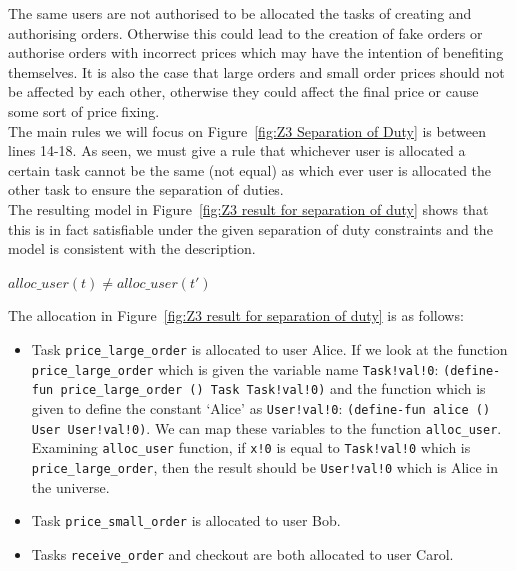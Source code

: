 \documentclass[a4paper]{report}
\begin{document}
The same users are not authorised to be allocated the tasks of creating and authorising orders. Otherwise this could lead to the creation of fake orders or authorise orders with incorrect prices which may have the intention of benefiting themselves. It is also the case that large orders and small order prices should not be affected by each other, otherwise they could affect the final price or cause some sort of price fixing.\\

The main rules we will focus on Figure~\ref{fig:Z3 Separation of Duty} is between lines 14-18. As seen, we must give a rule that whichever user is allocated a certain task cannot be the same (not equal) as which ever user is allocated the other task to ensure the separation of duties. \\

The resulting model in Figure~\ref{fig:Z3 result for separation of duty} shows that this is in fact satisfiable under the given separation of duty constraints and the model is consistent with the description.
\begin{center}
$alloc\_user(t) \neq alloc\_user(t\ensuremath{'})$
\end{center}
The allocation in Figure~\ref{fig:Z3 result for separation of duty} is as follows:
\begin{itemize}
\item Task \texttt{price\_large\_order} is allocated to user Alice. If we look at the function \texttt{price\_large\_order} which is given the variable name \texttt{Task!val!0}: \texttt{(define-fun price\_large\_order () Task Task!val!0)} and the function which is given to define the constant `Alice' as \texttt{User!val!0}: \texttt{(define-fun alice () User User!val!0)}. We can map these variables to the function \texttt{alloc\_user}. Examining \texttt{alloc\_user} function, if \texttt{x!0} is equal to \texttt{Task!val!0} which is \texttt{price\_large\_order}, then the result should be \texttt{User!val!0} which is Alice in the universe.
\item Task \texttt{price\_small\_order} is allocated to user Bob.
\item Tasks \texttt{receive\_order} and checkout are both allocated to user Carol.
\end{itemize}
\end{document}

